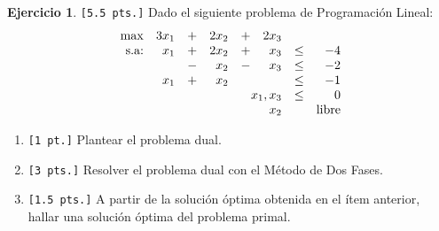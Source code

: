 \documentclass[a4paper,oneside,12pt]{amsart}
\theoremstyle{definition}
\newtheorem{quest}{Ejercicio}
\begin{document}
\begin{quest} 
\verb|[5.5 pts.]| Dado el siguiente problema de Programación Lineal:
    \[
        \begin{array}{rrcrcrcr}
            \max & 3x_1 & + & 2x_2 & + & 2x_3 & & \\
            \text{s.a:} & x_1 & + & 2x_2 & + & x_3 & \leq & -4\\
            & & - & x_2 & - & x_3 & \leq & -2\\
            & x_1 & + & x_2 &  & & \leq & -1\\
            & \multicolumn{5}{r}{x_1,x_3} & \leq & 0 \\
            & \multicolumn{5}{r}{x_2} &  & \text{libre} \\

        \end{array}
    \]
    \begin{enumerate}[label=\alph*)]
        \item \verb|[1 pt.]| Plantear el problema dual.
        \item \verb|[3 pts.]| Resolver el problema dual con el Método de Dos Fases.
        \item \verb|[1.5 pts.]| A partir de la solución óptima obtenida en el ítem anterior, hallar una solución
        óptima del problema
        primal.
    \end{enumerate}

\end{quest}


\end{document}
